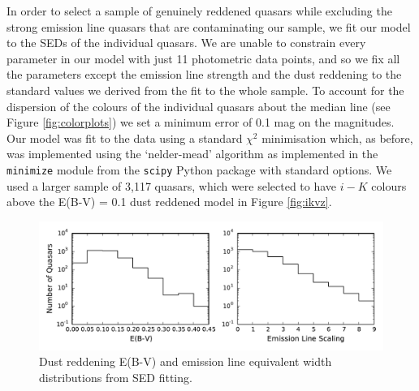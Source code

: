 In order to select a sample of genuinely reddened quasars while excluding the strong emission line quasars that are contaminating our sample, we fit our model to the SEDs of the individual quasars. We are unable to constrain every parameter in our model with just 11 photometric data points, and so we fix all the parameters except the emission line strength and the dust reddening to the standard values we derived from the fit to the whole sample. To account for the dispersion of the colours of the individual quasars about the median line (see Figure \ref{fig:colorplots}) we set a minimum error of 0.1 mag on the magnitudes. Our model was fit to the data using a standard $\chi^2$ minimisation which, as before, was implemented using the `nelder-mead' algorithm as implemented in the {\tt minimize} module from the {\tt scipy} Python package with standard options. We used a larger sample of 3,117 quasars, which were selected to have $i-K$ colours above the E(B-V) = 0.1 dust reddened model in Figure \ref{fig:ikvz}. 

\begin{figure}
  \centering
  \includegraphics[width=\textwidth]{figures/chapter06/ebvandelscalhist}
  \caption{Dust reddening E(B-V) and emission line equivalent width distributions from SED fitting.}
  \label{fig:ebvelscalhist}
\end{figure}

